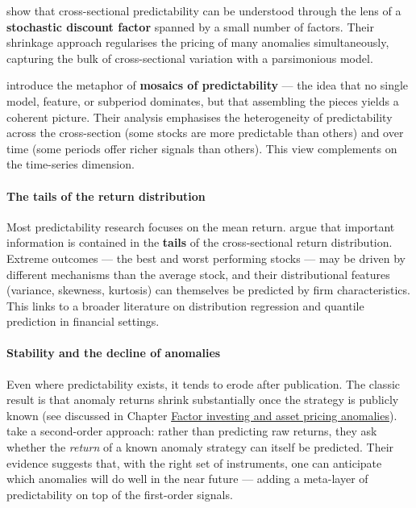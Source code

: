 \cite{kozak2019shrinking} show that cross-sectional predictability can be understood through the lens of a \textbf{stochastic discount factor} spanned by a small number of factors. Their shrinkage approach regularises the pricing of many anomalies simultaneously, capturing the bulk of cross-sectional variation with a parsimonious model.

\cite{cong2024mosaics} introduce the metaphor of \textbf{mosaics of predictability} --- the idea that no single model, feature, or subperiod dominates, but that assembling the pieces yields a coherent picture. Their analysis emphasises the heterogeneity of predictability across the cross-section (some stocks are more predictable than others) and over time (some periods offer richer signals than others). This view complements \cite{farmer2019pockets} on the time-series dimension.

\paragraph{The tails of the return distribution}

Most predictability research focuses on the mean return. \cite{uribe2025moving} argue that important information is contained in the \textbf{tails} of the cross-sectional return distribution. Extreme outcomes --- the best and worst performing stocks --- may be driven by different mechanisms than the average stock, and their distributional features (variance, skewness, kurtosis) can themselves be predicted by firm characteristics. This links to a broader literature on distribution regression and quantile prediction in financial settings.

\paragraph{Stability and the decline of anomalies}

Even where predictability exists, it tends to erode after publication. The classic result is that anomaly returns shrink substantially once the strategy is publicly known (see \citet{mclean2016does} discussed in Chapter \href{/chap-03-asset-pricing}{Factor investing and asset pricing anomalies}). \cite{bowles2024predicting} take a second-order approach: rather than predicting raw returns, they ask whether the \textit{return} of a known anomaly strategy can itself be predicted. Their evidence suggests that, with the right set of instruments, one can anticipate which anomalies will do well in the near future --- adding a meta-layer of predictability on top of the first-order signals.

